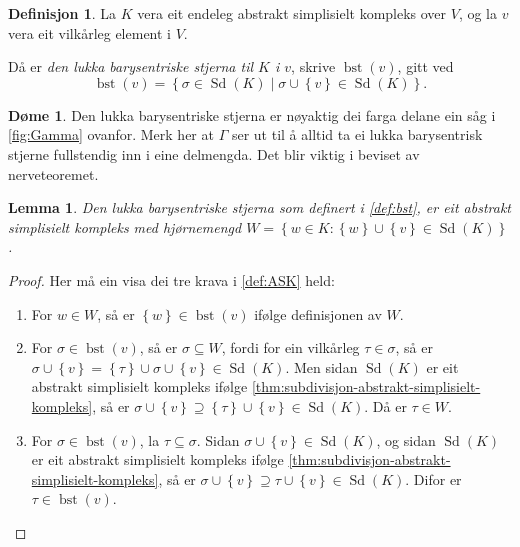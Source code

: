 \documentclass[a4paper, 12pt, norsk]{article}
\theoremstyle{plain}
\newtheorem{lemma}[theorem]{Lemma}
\theoremstyle{definition}
\newtheorem{definition}[theorem]{Definisjon}
\newtheorem{example}[theorem]{Døme}
\newcommand{\union}{ \mathop{\cup}\limits }
\newcommand{\set}[1]{ \left\{ #1 \right\} } %
\DeclareMathOperator{\Sd}{Sd} %
\DeclareMathOperator{\bst}{bst} %
\begin{document}
\begin{definition} \label{def:bst}
	La \( K \) vera eit endeleg abstrakt simplisielt kompleks over \( V \), og la \( v \) vera eit vilkårleg element i \( V \).
	
	Då er \emph{den lukka barysentriske stjerna til \( K \) i \( v \)}, skrive \( \bst(v) \), gitt ved
	\[
		\bst(v) = \set{\sigma \in \Sd(K) \mid \sigma \union \set{v} \in \Sd(K)}.
	\]
\end{definition}

\begin{example}
	Den lukka barysentriske stjerna er nøyaktig dei farga delane ein såg i \autoref{fig:Gamma} ovanfor. Merk her at \( \Gamma \) ser ut til å alltid ta ei lukka barysentrisk stjerne fullstendig inn i eine delmengda. Det blir viktig i beviset av nerveteoremet.
\end{example}

\begin{lemma} \label{thm:bst-ask}
	Den lukka barysentriske stjerna som definert i \autoref{def:bst}, er eit abstrakt simplisielt kompleks med hjørnemengd \( W = \set{w \in K : \set{w} \union \set{v} \in \Sd(K)} \).
\end{lemma}

\begin{proof}
	Her må ein visa dei tre krava i \autoref{def:ASK} held:
	\begin{enumerate}
		\item{For \( w \in W \), så er \( \set{w} \in \bst(v) \) ifølge definisjonen av \( W \).}
  		\item{For \( \sigma \in \bst(v) \), så er \( \sigma \subseteq W \), fordi for ein vilkårleg \( \tau \in \sigma \), så er \( \sigma \union \set{v} = \set{\tau} \union \sigma \union \set{v} \in \Sd(K) \). Men sidan \( \Sd(K) \) er eit abstrakt simplisielt kompleks ifølge \autoref{thm:subdivisjon-abstrakt-simplisielt-kompleks}, så er \( \sigma \union \set{v} \supseteq \set{\tau} \union \set{v} \in \Sd(K) \). Då er \( \tau \in W \).}
    	\item{For \( \sigma \in \bst(v) \), la \( \tau \subseteq \sigma \). Sidan \( \sigma \union \set{v} \in \Sd(K) \), og sidan \( \Sd(K) \) er eit abstrakt simplisielt kompleks ifølge \autoref{thm:subdivisjon-abstrakt-simplisielt-kompleks}, så er \( \sigma \union \set{v} \supseteq \tau \union \set{v} \in \Sd(K) \). Difor er \( \tau \in \bst(v) \). \qedhere}
	\end{enumerate}
\end{proof}
\end{document}
